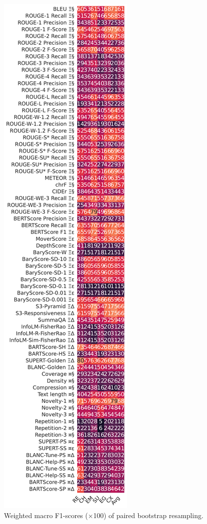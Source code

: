 \begin{figure}[h]
\centering
\includegraphics[width=0.375\columnwidth]{pictures/bootstrap_fscores.pdf}
\caption{Weighted macro F1-scores ($\times$100) of paired bootstrap resampling.}
\label{fig:fscores}
\end{figure}